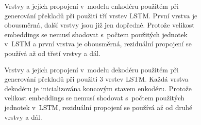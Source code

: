\begin{figure}[H]
    \begin{center}
    \end{center}
	\caption{Vrstvy a jejich propojení v~modelu enkodéru použitém při generování překladů při použití tří vrstev LSTM. První vrstva je obousměrná, další vrstvy jsou již jen dopředné. Protože velikost embeddings se nemusí shodovat s~počtem použitých jednotek v~LSTM a první vrstva je obousměrná, reziduální propojení se používá až od třetí vrstvy a dál.}
	\label{img:encodermodel}
\end{figure}

\begin{figure}[H]
    \begin{center}
    \end{center}
	\caption{Vrstvy a jejich propojení v~modelu dekodéru použitém při generování překladů při použití 3 vrstev LSTM. Každá vrstva dekodéru je inicializována koncovým stavem enkodéru. Protože velikost embeddings se nemusí shodovat s~počtem použitých jednotek v~LSTM, reziduální propojení se používá až od druhé vrstvy a dál.}
	\label{img:decodermodel}
\end{figure}


